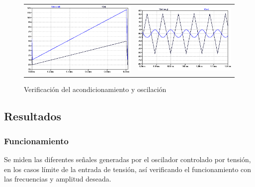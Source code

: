 \begin{figure}[H]
    \centering
    \begin{tabular}{c c}
        \includegraphics[scale=0.35]{../EJ3/Recursos/verificacion_acondicionamiento.png} &
        \includegraphics[scale=0.4]{../EJ3/Recursos/verificacion_vco.png}
    \end{tabular}
    \caption{Verificaci\'on del acondicionamiento y oscilaci\'on}
    \label{fig:verificacion}
\end{figure}

\subsection{Resultados}

\subsubsection{Funcionamiento}
Se miden las diferentes se\~nales generadas por el oscilador controlado por tensi\'on, en los casos l\'imite de la entrada de tensi\'on, as\'i
verificando el funcionamiento con las frecuencias y amplitud deseada.

